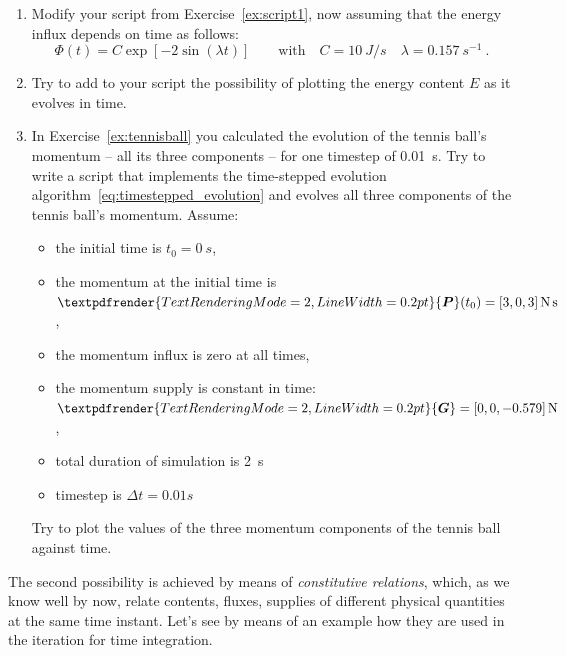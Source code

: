 \documentclass[a4paper,12pt,%
onecolumn,oneside,%
british%
]{memoir}
\renewcommand*{\bm}[1]{\textpdfrender{TextRenderingMode=2,LineWidth=0.2pt}{\boldsymbol{#1}}}
\newcommand*{\incr}{\Delta}%
\renewcommand*{\|}[1][]{\nonscript\:#1\vert\nonscript\:\mathopen{}}
\newcommand*{\yti}{t_{0}}
\newcommand*{\Dt}{\incr t}
\newcommand*{\yE}{E}
\newcommand*{\yH}{\varPhi}%
\newcommand*{\yP}{\bm{P}}
\newcommand*{\yG}{\bm{G}}
\begin{document}
\begin{exercise}[label={ex:script2}]
  \begin{enumerate}[exerc]
  \item Modify your script from Exercise~\ref{ex:script1}, now assuming that the energy influx depends on time as follows:
    \begin{equation*}
      \yH(t) = C \exp[-2\sin(\lambda t)]
      \qquad\text{with}\quad
      C = \qty{10}{J/s}\quad \lambda = \qty{0.157}{s^{-1}} \ .
    \end{equation*}


  \item Try to add to your script the possibility of plotting the energy content $\yE$ as it evolves in time.

    \medskip

  \item In Exercise~\ref{ex:tennisball} you calculated the evolution of the tennis ball's momentum -- all its three components -- for one timestep of \qty{0.01}{s}. Try to write a script that implements the time-stepped evolution algorithm~\eqref{eq:timestepped_evolution} and evolves all three components of the tennis ball's momentum. Assume:
    \begin{itemize}[nosep]
    \item the initial time is $\yti = \qty{0}{s}$,
    \item the momentum at the initial time is $\yP(\yti) = [3,0,3]\,\unit{N\,s}$,
    \item the momentum influx is zero at all times,
    \item the momentum supply is constant in time: $\yG=[0,0,\num{-0.579}]\,\unit{N}$,
    \item total duration of simulation is \qty{2}{s}
    \item timestep is $\Dt={0.01}{s}$
    \end{itemize}

    Try to plot the values of the three momentum components of the tennis ball against time.
  \end{enumerate}
\end{exercise}

\medskip

The second possibility is achieved by means of \emph{constitutive relations}, which, as we know well by now, relate contents, fluxes, supplies of different physical quantities at the same time instant. Let's see by means of an example how they are used in the iteration for time integration.
\end{document}
